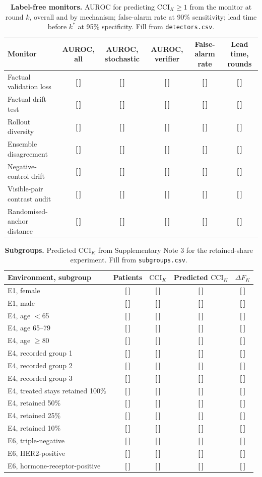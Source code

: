 \documentclass[11pt,a4paper]{article}
\newcommand{\T}{{\color{red}\textbf{[\,]}}}
\newcommand{\CCI}{\mathrm{CCI}}
\begin{document}
\begin{table}[!htbp]\centering\footnotesize
\caption{\textbf{Label-free monitors.} AUROC for predicting $\CCI_K\ge1$ from the monitor at round $k$, overall and by mechanism; false-alarm rate at 90\% sensitivity; lead time before $k^*$ at 95\% specificity. Fill from \texttt{detectors.csv}.}
\begin{tabularx}{\textwidth}{@{}p{3.9cm} C C C C C@{}}\toprule
Monitor & AUROC, all & AUROC, stochastic & AUROC, verifier & False-alarm rate & Lead time, rounds\\\midrule
Factual validation loss & \T & \T & \T & \T & \T\\
Factual drift test & \T & \T & \T & \T & \T\\
Rollout diversity & \T & \T & \T & \T & \T\\
Ensemble disagreement & \T & \T & \T & \T & \T\\
Negative-control drift & \T & \T & \T & \T & \T\\
Visible-pair contrast audit & \T & \T & \T & \T & \T\\
Randomised-anchor distance & \T & \T & \T & \T & \T\\
\bottomrule\end{tabularx}
\end{table}
\FloatBarrier
\begin{table}[!htbp]\centering\footnotesize
\caption{\textbf{Subgroups.} Predicted $\CCI_K$ from Supplementary Note 3 for the retained-share experiment. Fill from \texttt{subgroups.csv}.}
\begin{tabularx}{\textwidth}{@{}p{3.9cm} C C C C@{}}\toprule
Environment, subgroup & Patients & $\CCI_K$ & Predicted $\CCI_K$ & $\Delta F_K$\\\midrule
E1, female & \T & \T & \T & \T\\
E1, male & \T & \T & \T & \T\\
\midrule
E4, age $<$65 & \T & \T & \T & \T\\
E4, age 65--79 & \T & \T & \T & \T\\
E4, age $\ge$80 & \T & \T & \T & \T\\
E4, recorded group 1 & \T & \T & \T & \T\\
E4, recorded group 2 & \T & \T & \T & \T\\
E4, recorded group 3 & \T & \T & \T & \T\\
\midrule
E4, treated stays retained 100\% & \T & \T & \T & \T\\
E4, retained 50\% & \T & \T & \T & \T\\
E4, retained 25\% & \T & \T & \T & \T\\
E4, retained 10\% & \T & \T & \T & \T\\
\midrule
E6, triple-negative & \T & \T & \T & \T\\
E6, HER2-positive & \T & \T & \T & \T\\
E6, hormone-receptor-positive & \T & \T & \T & \T\\
\bottomrule\end{tabularx}
\end{table}
\end{document}
